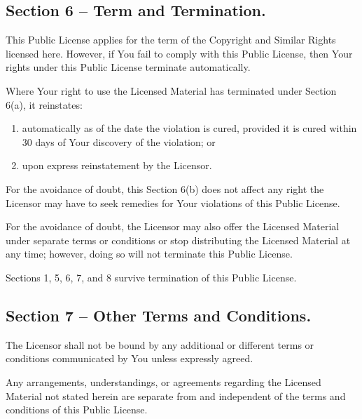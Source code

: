 \documentclass[12pt,a4paper]{article}
\begin{document}
\subsection*{Section 6 – Term and Termination.}

\begin{description}
\setlength{\itemsep}{0cm}
\item[a.]
    This Public License applies for the term of the Copyright and Similar Rights licensed here. However, if You fail to comply with this Public License, then Your rights under this Public License terminate automatically.
\item[b.]
    Where Your right to use the Licensed Material has terminated under Section 6(a), it reinstates:
\begin{enumerate}
\setlength{\itemsep}{0cm}
\item         automatically as of the date the violation is cured, provided it is cured within 30 days of Your discovery of the violation; or
\item        upon express reinstatement by the Licensor.
\end{enumerate}
For the avoidance of doubt, this Section 6(b) does not affect any right the Licensor may have to seek remedies for Your violations of this Public License.
\item[c.]    For the avoidance of doubt, the Licensor may also offer the Licensed Material under separate terms or conditions or stop distributing the Licensed Material at any time; however, doing so will not terminate this Public License.
\item[d.]    Sections 1, 5, 6, 7, and 8 survive termination of this Public License.
\end{description}

\subsection*{Section 7 – Other Terms and Conditions.}

\begin{description}
\setlength{\itemsep}{0cm}
\item[a.]
    The Licensor shall not be bound by any additional or different terms or conditions communicated by You unless expressly agreed.
\item[b.]   Any arrangements, understandings, or agreements regarding the Licensed Material not stated herein are separate from and independent of the terms and conditions of this Public License.
\end{description}
\end{document}
